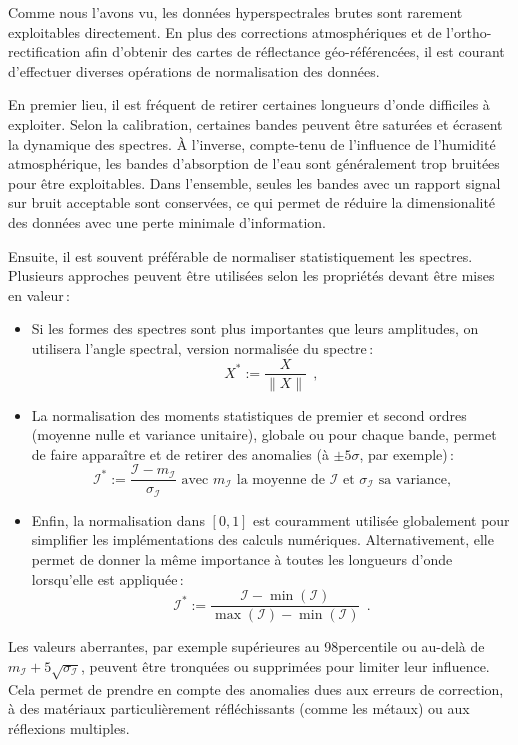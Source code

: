 Comme nous l'avons vu, les données hyperspectrales brutes sont rarement exploitables directement. En plus des corrections atmosphériques et de l'ortho-rectification afin d'obtenir des cartes de réflectance géo-référencées, il est courant d'effectuer diverses opérations de normalisation des données.

En premier lieu, il est fréquent de retirer certaines longueurs d'onde difficiles à exploiter. Selon la calibration, certaines bandes peuvent être saturées et écrasent la dynamique des spectres. À l'inverse, compte-tenu de l'influence de l'humidité atmosphérique, les bandes d'absorption de l'eau sont généralement trop bruitées pour être exploitables. Dans l'ensemble, seules les bandes avec un rapport signal sur bruit acceptable sont conservées, ce qui permet de réduire la dimensionalité des données avec une perte minimale d'information.

Ensuite, il est souvent préférable de normaliser statistiquement les spectres. Plusieurs approches peuvent être utilisées selon les propriétés devant être mises en valeur\,:
\begin{itemize}
\item Si les formes des spectres sont plus importantes que leurs amplitudes, on utilisera l'angle spectral, version normalisée du spectre\,:
$$X^* := \frac{X}{\| X \|}~~,$$
\item La normalisation des moments statistiques de premier et second ordres (moyenne nulle et variance unitaire), globale ou pour chaque bande, permet de faire apparaître et de retirer des anomalies (à $\pm5\sigma$, par exemple)\,:
$$\mathcal{I}^* := \frac{\mathcal{I} - m_\mathcal{I}}{\sigma_\mathcal{I}} \text{ avec } m_\mathcal{I} \text{ la moyenne de } \mathcal{I} \text{ et } \sigma_\mathcal{I} \text{ sa variance,}$$
\item Enfin, la normalisation dans $[0,1]$ est couramment utilisée globalement pour simplifier les implémentations des calculs numériques. Alternativement, elle permet de donner la même importance à toutes les longueurs d'onde lorsqu'elle est appliquée\,:
$$\mathcal{I}^* := \frac{\mathcal{I} - \min(\mathcal{I})}{\max(\mathcal{I}) - \min(\mathcal{I})}~~.$$
\end{itemize}

Les valeurs aberrantes, par exemple supérieures au 98\ieme percentile ou au-delà de $m_\mathcal{I} + 5\sqrt{\sigma_\mathcal{I}}$, peuvent être tronquées ou supprimées pour limiter leur influence. Cela permet de prendre en compte des anomalies dues aux erreurs de correction, à des matériaux particulièrement réfléchissants (comme les métaux) ou aux réflexions multiples.

